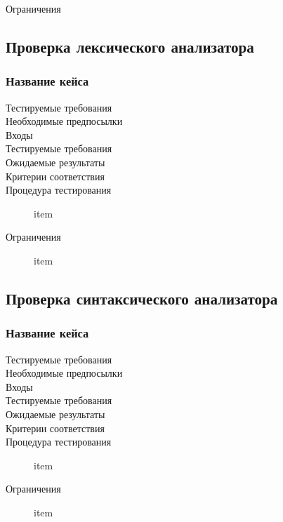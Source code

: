 \documentclass[a4paper, 12pt]{article}
\begin{document}
\begin{description}
	\item[] 
	\item[]
	\item[] %
	\item[]
		
	\item[]
		
	\item[]
		
	\item[Ограничения]
\end{description}

\subsection{Проверка лексического анализатора} %
\subsubsection{Название кейса} %


\begin{description}
	\item[Тестируемые требования] 
	\item[Необходимые предпосылки] 
	\item[Входы] %
	\item[Тестируемые требования] 
	\item[Ожидаемые результаты]
	\item[Критерии соответствия]
	\item[Процедура тестирования] item
	\item[Ограничения] item
\end{description}

\subsection{Проверка синтаксического анализатора} %
\subsubsection{Название кейса} %


\begin{description}
	\item[Тестируемые требования] 
	\item[Необходимые предпосылки] 
	\item[Входы] %
	\item[Тестируемые требования] 
	\item[Ожидаемые результаты]
	\item[Критерии соответствия]
	\item[Процедура тестирования] item
	\item[Ограничения] item
\end{description}
\end{document}
